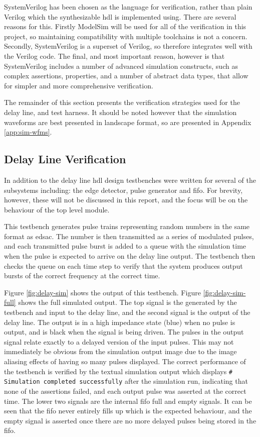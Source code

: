 SystemVerilog has been chosen as the language for verification, rather than plain Verilog which the synthesizable \gls{hdl} is implemented using. There are several reasons for this. Firstly ModelSim will be used for all of the verification in this project, so maintaining compatibility with multiple toolchains is not a concern. Secondly, SystemVerilog is a superset of Verilog, so therefore integrates well with the Verilog code. The final, and most important reason, however is that SystemVerilog includes a number of advanced simulation constructs, such as complex assertions, properties, and a number of abstract data types, that allow for simpler and more comprehensive verification.

The remainder of this section presents the verification strategies used for the delay line, and test harness. It should be noted however that the simulation waveforms are best presented in landscape format, so are presented in Appendix \ref{app:sim-wfms}.

\subsection{Delay Line Verification}

In addition to the delay line \gls{hdl} design testbenches were written for several of the subsystems including: the edge detector, pulse generator and \gls{fifo}. For brevity, however, these will not be discussed in this report, and the focus will be on the behaviour of the top level module.

This testbench generates pulse trains representing random numbers in the same format as \gls{edsac}. The number is then transmitted as a series of modulated pulses, and each transmitted pulse burst is added to a queue with the simulation time when the pulse is expected to arrive on the delay line output. The testbench then checks the queue on each time step to verify that the system produces output bursts of the correct frequency at the correct time.
 
Figure \ref{fig:delay-sim} shows the output of this testbench. Figure \ref{fig:delay-sim-full} shows the full simulated output. The top signal is the generated by the testbench and input to the delay line, and the second signal is the output of the delay line. The output is in a high impedance state (blue) when no pulse is output, and is black when the signal is being driven. The pulses in the output signal relate exactly to a delayed version of the input pulses. This may not immediately be obvious from the simulation output image due to the image aliasing effects of having so many pulses displayed. The correct performance of the testbench is verified by the textual simulation output which displays \texttt{\# Simulation completed successfully} after the simulation run, indicating that none of the assertions failed, and each output pulse was asserted at the correct time. The lower two signals are the internal \gls{fifo} full and empty signals. It can be seen that the \gls{fifo} never entirely fills up which is the expected behaviour, and the empty signal is asserted once there are no more delayed pulses being stored in the \gls{fifo}.
 
